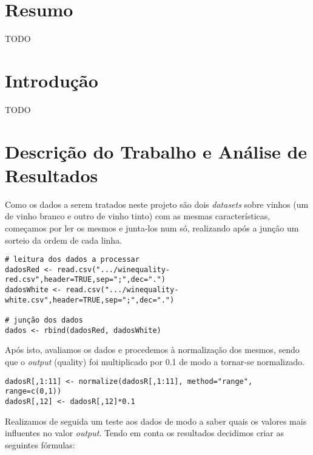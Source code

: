 \documentclass{article}
\begin{document}
\section{Resumo}
{\color{red}TODO}
\vspace*{\fill}

\newpage

\vspace*{\fill}
\tableofcontents
\vspace*{\fill}

\newpage

\vspace*{\fill}
\section{Introdução}
{\color{red}TODO}
\vspace*{\fill}

\newpage

\section{Descrição do Trabalho e Análise de Resultados}

Como os dados a serem tratados neste projeto são dois \textit{datasets} sobre vinhos (um de vinho branco e outro de vinho tinto) com as mesmas características, começamos por ler os mesmos e junta-los num só, realizando após a junção um sorteio da ordem de cada linha.

\begin{verbatim}
# leitura dos dados a processar
dadosRed <- read.csv(".../winequality-red.csv",header=TRUE,sep=";",dec=".")
dadosWhite <- read.csv(".../winequality-white.csv",header=TRUE,sep=";",dec=".")

# junção dos dados
dados <- rbind(dadosRed, dadosWhite)
\end{verbatim}

Após isto, avaliamos os dados e procedemos à normalização dos mesmos, sendo que o \textit{output} (quality) foi multiplicado por 0.1 de modo a tornar-se normalizado.

\begin{verbatim}
dadosR[,1:11] <- normalize(dadosR[,1:11], method="range", range=c(0,1))
dadosR[,12] <- dadosR[,12]*0.1
\end{verbatim}

Realizamos de seguida um teste aos dados de modo a saber quais os valores mais influentes no valor \textit{output}. Tendo em conta os resultados decidimos criar as seguintes fórmulas:
\end{document}
